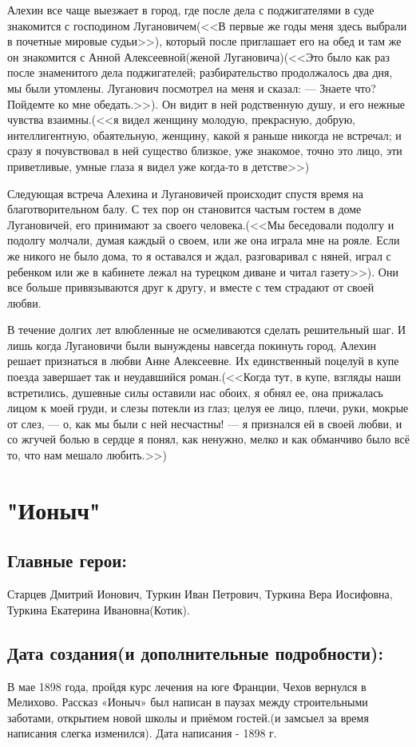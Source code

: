 \documentclass[a4paper,12pt]{article}
\begin{document}
	Алехин все чаще выезжает в город, где после дела с поджигателями в суде знакомится с господином Лугановичем(<<В первые же годы меня здесь выбрали в почетные мировые судьи>>), который после приглашает его на обед и там же он знакомится с Анной Алексеевной(женой Лугановича)(<<Это было как раз после знаменитого дела поджигателей; разбирательство продолжалось два дня, мы были утомлены. Луганович посмотрел на меня и сказал:
	 — Знаете что? Пойдемте ко мне обедать.>>).
	Он видит в ней родственную душу, и его нежные чувства взаимны.(<<я видел женщину молодую, прекрасную, добрую, интеллигентную, обаятельную, женщину, какой я раньше никогда не встречал; и сразу я почувствовал в ней существо близкое, уже знакомое, точно это лицо, эти приветливые, умные глаза я видел уже когда-то в детстве>>)
	
	Следующая встреча Алехина и Лугановичей происходит спустя время на благотворительном балу. С тех пор он становится частым гостем в доме Лугановичей, его принимают за своего человека.(<<Мы беседовали подолгу и подолгу молчали, думая каждый о своем, или же она играла мне на рояле. Если же никого не было дома, то я оставался и ждал, разговаривал с няней, играл с ребенком или же в кабинете лежал на турецком диване и читал газету>>). Они все больше привязываются друг к другу, и вместе с тем страдают от своей любви.
	
	В течение долгих лет влюбленные не осмеливаются сделать решительный шаг. И лишь когда Лугановичи были вынуждены навсегда покинуть город, Алехин решает признаться в любви Анне Алексеевне. Их единственный поцелуй в купе поезда завершает так и неудавшийся роман.(<<Когда тут, в купе, взгляды наши встретились, душевные силы оставили нас обоих, я обнял ее, она прижалась лицом к моей груди, и слезы потекли из глаз; целуя ее лицо, плечи, руки, мокрые от слез, — о, как мы были с ней несчастны! — я признался ей в своей любви, и со жгучей болью в сердце я понял, как ненужно, мелко и как обманчиво было всё то, что нам мешало любить.>>)
	
	\section{"Ионыч"}
	\subsection{Главные герои: }
	Старцев Дмитрий Ионович, Туркин Иван Петрович, Туркина Вера Иосифовна, Туркина Екатерина Ивановна(Котик).
	\subsection{Дата создания(и дополнительные подробности): }
	В мае 1898 года, пройдя курс лечения на юге Франции, Чехов вернулся в Мелихово. Рассказ «Ионыч» был написан в паузах между строительными заботами, открытием новой школы и приёмом гостей.(и замсыел за время написания слегка изменился).
	\noindent
	Дата написания - 1898 г.
	
\end{document}
